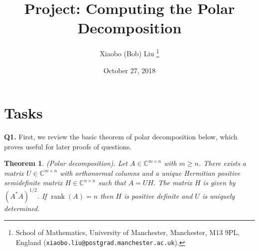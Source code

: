 \documentclass[12pt]{article}
\title{Project: Computing the Polar Decomposition}
\author{Xiaobo (Bob) Liu%
        \thanks{%
                School of Mathematics,
                University of Manchester,
                Manchester, M13 9PL, England
                (\texttt{xiaobo.liu@postgrad.manchester.ac.uk}).
               }
}
\date{October 27, 2018}
\def\C{\mathbb{C}}
\def\nbyn{n \times n}
\def\mbyn{m \times n}
\DeclareMathOperator{\rank}{rank}
\newtheorem{theorem}{Theorem}
\begin{document}
\maketitle

\section*{Tasks}
{\bf Q1.} First, we review the basic theorem of polar decomposition below, which proves useful for later proofs of questions.
\begin{theorem}\label{polardecom}
	(Polar decomposition). Let $A\in\C^{\mbyn}$ with $m\ge n$. There exists a matrix 
	$U\in\C^{\mbyn}$ with orthonormal columns and a unique Hermitian positive 
	semidefinite matrix $H\in\C^{\nbyn}$ such that $A=UH$. The matrix $H$ is given by 
	$(A^*A)^{1/2}$. If $\rank(A)=n$ then $H$ is positive definite and $U$ is 
	uniquely determined.
	
\end{theorem}
\unskip
\end{document}

